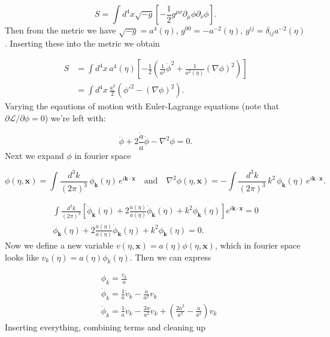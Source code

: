 \begin{equation*}
    S = \int d^4x \sqrt{-g} \left[ - \frac{1}{2}g^{\mu \nu} \partial_{\mu} \phi \partial_{\nu} \phi \right].
\end{equation*}
Then from the metric we have $\sqrt{-g} = a^4(\eta)$, $g^{00}=-a^{-2}(\eta)$, $g^{ij} = \delta_{ij} a^{-2}(\eta)$. Inserting these into the metric we obtain

\begin{align*}
    S &= \int d^4x\, a^4(\eta)\left[-\frac{1}{2}\left(\frac{1}{a^2}\dot{\phi}^2 + \frac{1}{a^2(\eta)}(\nabla\phi)^2\right)\right]\\
    &= \int d^4x\, \frac{a^2}{2}\left(\phi'^2 - (\nabla\phi)^2\right).
\end{align*}
Varying the eqautions of motion with Euler-Lagrange equations (note that $\partial \mathcal{L}/ \partial \phi = 0$) we're left with:

\begin{equation*}
    \ddot{\phi} + 2 \frac{\dot{a}}{a} \dot{\phi} - \nabla^2 \phi = 0.
\end{equation*}
Next we expand $\phi$ in fourier space

\begin{equation*}
    \phi(\eta,\bm{x}) = \int \frac{d^3k}{(2\pi)^3}\,\phi_{\bm{k}}(\eta)\,e^{i\bm{k}\cdot\bm{x}} \quad \text{and} \quad \nabla^2 \phi(\eta,\bm{x}) = - \int \frac{d^3k}{(2\pi)^3}\,k^2\,\phi_{\bm{k}}(\eta)\,e^{i\bm{k}\cdot\bm{x}}.
\end{equation*}

\begin{align*}
    \int \frac{d^3k}{(2\pi)^3}\left[\ddot{\phi}_{\bm{k}}(\eta) + 2\frac{\dot{a}(\eta)}{a(\eta)}\dot{\phi}_{\bm{k}}(\eta) + k^2 \phi_{\bm{k}}(\eta)\right] e^{i\bm{k}\cdot\bm{x}} = 0\\
    \ddot{\phi}_{\bm{k}}(\eta) + 2\frac{\dot{a}(\eta)}{a(\eta)}\dot{\phi}_{\bm{k}}(\eta) + k^2 \phi_{\bm{k}}(\eta) = 0.
\end{align*}
Now we define a new variable $v(\eta, \bm{x}) = a(\eta) \phi(\eta, \bm{x})$, which in fourier space looks like $v_k(\eta) = a(\eta) \phi_k(\eta)$. Then we can express

\begin{align*}
    & \phi_k = \frac{v_k}{a} \\
    & \dot{\phi}_k = \frac{1}{a}\dot{v}_k - \frac{\dot{a}}{a^2}v_k \\
    & \ddot{\phi}_k = \frac{1}{a}\ddot{v}_k - \frac{2\dot{a}}{a^2}\dot{v}_k + \left(\frac{2\dot{a}^2}{a^3} - \frac{\ddot{a}}{a^2}\right)v_k
\end{align*}
Inserting everything, combining terms and cleaning up

